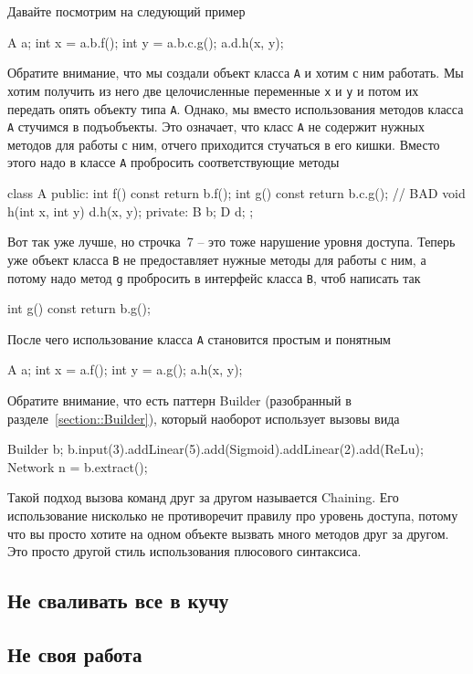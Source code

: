Давайте посмотрим на следующий пример
\begin{cppcode}
A a;
int x = a.b.f();
int y = a.b.c.g();
a.d.h(x, y);
\end{cppcode}
Обратите внимание, что мы создали объект класса \verb"A" и хотим с ним работать.
Мы хотим получить из него две целочисленные переменные \verb"x" и \verb"y" и потом их передать опять объекту типа \verb"A".
Однако, мы вместо использования методов класса \verb"A" стучимся в подъобъекты.
Это означает, что класс \verb"A" не содержит нужных методов для работы с ним, отчего приходится стучаться в его кишки.
Вместо этого надо в классе \verb"A" пробросить соответствующие методы
\begin{cppcode}
class A {
public:
  int f() const {
    return b.f();
  }
  int g() const {
    return b.c.g(); // BAD
  }
  void h(int x, int y) {
    d.h(x, y);
  }
private:
  B b;
  D d;
};
\end{cppcode}
Вот так уже лучше, но строчка~7 -- это тоже нарушение уровня доступа.
Теперь уже объект класса \verb"B" не предоставляет нужные методы для работы с ним, а потому надо метод \verb"g" пробросить в интерфейс класса \verb"B", чтоб написать так
\begin{cppcode}
int g() const {
  return b.g();
}
\end{cppcode}
После чего использование класса \verb"A" становится простым и понятным
\begin{cppcode}
A a;
int x = a.f();
int y = a.g();
a.h(x, y);
\end{cppcode}
Обратите внимание, что есть паттерн Builder (разобранный в разделе~\ref{section::Builder}), который наоборот использует вызовы вида
\begin{cppcode}
Builder b;
b.input(3).addLinear(5).add(Sigmoid).addLinear(2).add(ReLu);
Network n = b.extract();
\end{cppcode}
Такой подход вызова команд друг за другом называется Chaining.
Его использование нисколько не противоречит правилу про уровень доступа, потому что вы просто хотите на одном объекте вызвать много методов друг за другом.
Это просто другой стиль использования плюсового синтаксиса.

\subsection{Не сваливать все в кучу}
\label{section::SeparateStuff}

\subsection{Не своя работа}
\label{section::WrongWork}


